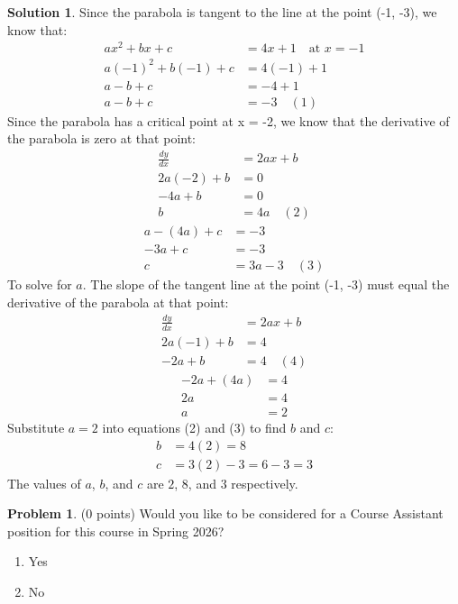 \documentclass[11pt]{article}
\theoremstyle{definition}
\newtheorem{problem}{Problem}
\newtheorem*{solution}{Solution}
\begin{document}
\begin{solution}
    Since the parabola is tangent to the line at the point (-1, -3), we know that:
    \begin{align}
        ax^2 + bx + c &= 4x + 1 \quad \text{at } x = -1 \\
        a(-1)^2 + b(-1) + c &= 4(-1) + 1 \\
        a - b + c &= -4 + 1 \\
        a - b + c &= -3 \quad (1)
    \end{align}
    Since the parabola has a critical point at x = -2, we know that the derivative of the parabola is zero at that point:
    \begin{align}
        \frac{dy}{dx} &= 2ax + b \\
        2a(-2) + b &= 0 \\
        -4a + b &= 0 \\
        b &= 4a \quad (2)
    \end{align}
    \begin{align}
        a - (4a) + c &= -3 \\
        -3a + c &= -3 \\
        c &= 3a - 3 \quad (3)
    \end{align}
    To solve for $a$. The slope of the tangent line at the point (-1, -3) must equal the derivative of the parabola at that point:
    \begin{align}
        \frac{dy}{dx} &= 2ax + b \\
        2a(-1) + b &= 4 \\
        -2a + b &= 4 \quad (4)
    \end{align}
    \begin{align}
        -2a + (4a) &= 4 \\
        2a &= 4 \\
        a &= 2
    \end{align}
    Substitute $a = 2$ into equations (2) and (3) to find $b$ and $c$:
    \begin{align}
        b &= 4(2) = 8 \\
        c &= 3(2) - 3 = 6 - 3 = 3
    \end{align}
    The values of $a$, $b$, and $c$ are $2$, $8$, and $3$ respectively.
\end{solution}


\begin{problem}
(0 points) Would you like to be considered for a Course Assistant position for this course in Spring 2026?
\begin{enumerate}
    \item Yes
    \item No
\end{enumerate}
\end{problem}
\end{document}

